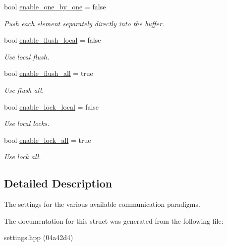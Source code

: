 \begin{DoxyCompactItemize}
bool \hyperlink{structschwz_1_1Settings_1_1comm__settings_aae063b9fcf2bc8e49e960286e4c0939f}{enable\+\_\+one\+\_\+by\+\_\+one} = false
\begin{DoxyCompactList}\small\item\em Push each element separately directly into the buffer. \end{DoxyCompactList}\item 
\mbox{\label{structschwz_1_1Settings_1_1comm__settings_a5bea917e0dc11a5a671bd4d8cdb3e3cf}} 
bool \hyperlink{structschwz_1_1Settings_1_1comm__settings_a5bea917e0dc11a5a671bd4d8cdb3e3cf}{enable\+\_\+flush\+\_\+local} = false
\begin{DoxyCompactList}\small\item\em Use local flush. \end{DoxyCompactList}\item 
\mbox{\label{structschwz_1_1Settings_1_1comm__settings_a3eb62d22f79472020fce577ceddad916}} 
bool \hyperlink{structschwz_1_1Settings_1_1comm__settings_a3eb62d22f79472020fce577ceddad916}{enable\+\_\+flush\+\_\+all} = true
\begin{DoxyCompactList}\small\item\em Use flush all. \end{DoxyCompactList}\item 
\mbox{\label{structschwz_1_1Settings_1_1comm__settings_abc715396bf51f36307caf88db02c819c}} 
bool \hyperlink{structschwz_1_1Settings_1_1comm__settings_abc715396bf51f36307caf88db02c819c}{enable\+\_\+lock\+\_\+local} = false
\begin{DoxyCompactList}\small\item\em Use local locks. \end{DoxyCompactList}\item 
\mbox{\label{structschwz_1_1Settings_1_1comm__settings_a39a59cea325ea1b57aba12e9ada4b91b}} 
bool \hyperlink{structschwz_1_1Settings_1_1comm__settings_a39a59cea325ea1b57aba12e9ada4b91b}{enable\+\_\+lock\+\_\+all} = true
\begin{DoxyCompactList}\small\item\em Use lock all. \end{DoxyCompactList}\end{DoxyCompactItemize}


\subsection{Detailed Description}
The settings for the various available communication paradigms. 

The documentation for this struct was generated from the following file\+:\begin{DoxyCompactItemize}
\item 
settings.\+hpp (04a42d4)\end{DoxyCompactItemize}
